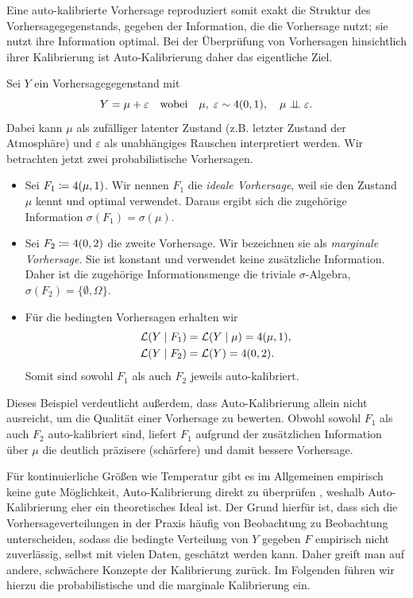 Eine auto-kalibrierte Vorhersage reproduziert somit exakt die Struktur des Vorhersagegegenstands, gegeben der Information, die die Vorhersage nutzt; sie nutzt ihre Information optimal. Bei der Überprüfung von Vorhersagen hinsichtlich ihrer Kalibrierung ist Auto-Kalibrierung daher das eigentliche Ziel.

\begin{bsp}  \label{bsp:auto_kal}
Sei $Y$ ein Vorhersagegegenstand mit 
\[
Y = \mu + \varepsilon \quad \text{wobei} \quad \mu,\; \varepsilon \sim 4(0,1), \quad \mu \perp\!\!\!\perp \varepsilon.
\]
Dabei kann $\mu$ als zufälliger latenter Zustand (z.B. letzter Zustand der Atmosphäre) und $\varepsilon$ als unabhängiges Rauschen interpretiert werden. Wir betrachten jetzt zwei probabilistische Vorhersagen.
\begin{itemize}
    \item Sei $F_1 \coloneqq 4(\mu,1)$. Wir nennen $F_1$ die \emph{ideale Vorhersage}, weil sie den Zustand $\mu$ kennt und optimal verwendet. Daraus ergibt sich die zugehörige Information $\sigma(F_1)=\sigma(\mu)$.
    \item Sei $F_2 \coloneqq 4(0,2)$ die zweite Vorhersage. Wir bezeichnen sie als \emph{marginale Vorhersage}. Sie ist konstant und verwendet keine zusätzliche Information. Daher ist die zugehörige Informationsmenge die triviale $\sigma$-Algebra,  $\sigma(F_2)=\{\emptyset, \Omega\}$.
    \item Für die bedingten Vorhersagen erhalten wir
        \begin{align*}
            \mathcal{L}(Y \mid F_1)&=\mathcal{L}(Y \mid \mu)=4(\mu,1), \\
            \mathcal{L}(Y \mid F_2)&=\mathcal{L}(Y)=4(0,2).
        \end{align*}
    Somit sind sowohl $F_1$ als auch $F_2$ jeweils auto-kalibriert.
\end{itemize}
Dieses Beispiel verdeutlicht außerdem, dass Auto-Kalibrierung allein nicht ausreicht, um die Qualität einer Vorhersage zu bewerten. Obwohl sowohl $F_1$ als auch $F_2$ auto-kalibriert sind, liefert $F_1$ aufgrund der zusätzlichen Information über $\mu$ die deutlich präzisere (schärfere) und damit bessere Vorhersage. 
\end{bsp}{}


Für kontinuierliche Größen wie Temperatur gibt es im Allgemeinen empirisch keine gute Möglichkeit, Auto-Kalibrierung direkt zu überprüfen \parencite{gneitingCombining2013}, weshalb Auto-Kalibrierung eher ein theoretisches Ideal ist. Der Grund hierfür ist, dass sich die Vorhersageverteilungen in der Praxis häufig von Beobachtung zu Beobachtung unterscheiden, sodass die bedingte Verteilung von $Y$ gegeben $F$ empirisch nicht zuverlässig, selbst mit vielen Daten, geschätzt werden kann. Daher greift man auf andere, schwächere Konzepte der Kalibrierung zurück. Im Folgenden führen wir hierzu die probabilistische und die marginale Kalibrierung ein.


